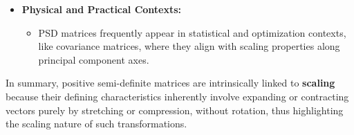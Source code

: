 \begin{airesult}
\begin{itemize}
  \vsp

  \item \textbf{Physical and Practical Contexts:}
  \begin{itemize}
    \item PSD matrices frequently appear in statistical and optimization contexts, like covariance
matrices, where they align with scaling properties along principal component axes.
  \end{itemize}
\end{itemize}

\vsp

In summary, positive semi-definite matrices are intrinsically linked to \textbf{scaling} because
their defining characteristics inherently involve expanding or contracting vectors purely by
stretching or compression, without rotation, thus highlighting the scaling nature of such
transformations.
\end{airesult}
